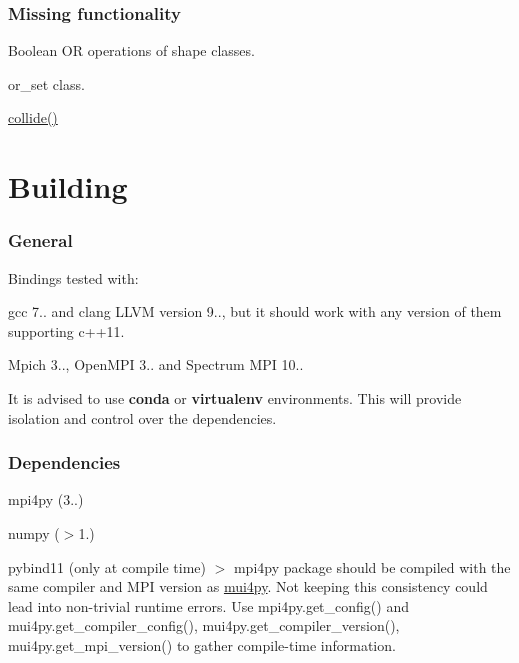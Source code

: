 \subsubsection*{Missing functionality}


\begin{DoxyItemize}
\item Boolean {\ttfamily OR} operations of {\ttfamily shape} classes.
\item {\ttfamily or\+\_\+set} class.
\item {\ttfamily \hyperlink{namespacemui_1_1geometry_a64dc85b99c0470026ea1e60d51acc086}{collide()}}
\end{DoxyItemize}

\section*{Building}

\subsubsection*{General}


\begin{DoxyItemize}
\item Bindings tested with\+:
\begin{DoxyItemize}
\item {\ttfamily gcc 7..} and {\ttfamily clang L\+L\+VM version 9..}, but it should work with any version of them supporting {\ttfamily c++11}.
\item {\ttfamily Mpich 3..}, {\ttfamily Open\+M\+PI 3..} and {\ttfamily Spectrum M\+PI 10.}.
\end{DoxyItemize}
\item It is advised to use {\bfseries conda} or {\bfseries virtualenv} environments. This will provide isolation and control over the dependencies.
\end{DoxyItemize}

\subsubsection*{Dependencies}


\begin{DoxyItemize}
\item mpi4py (3..)
\item numpy ($>$1.)
\item pybind11 (only at compile time) $>$ {\ttfamily mpi4py} package should be compiled with the same compiler and M\+PI version as {\ttfamily \hyperlink{namespacemui4py}{mui4py}}. Not keeping this consistency could lead into non-\/trivial runtime errors. Use {\ttfamily mpi4py.\+get\+\_\+config()} and {\ttfamily mui4py.\+get\+\_\+compiler\+\_\+config()}, {\ttfamily mui4py.\+get\+\_\+compiler\+\_\+version()}, {\ttfamily mui4py.\+get\+\_\+mpi\+\_\+version()} to gather compile-\/time information.
\end{DoxyItemize}


